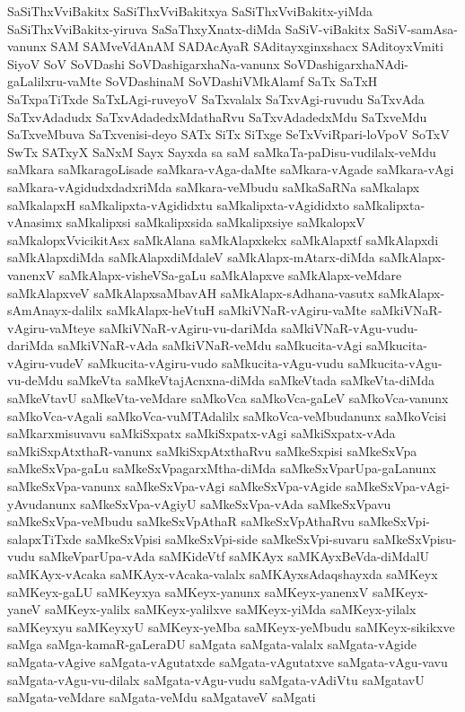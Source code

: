 {SaSiThxVviBakitx
SaSiThxVviBakitxya
SaSiThxVviBakitx-yiMda
SaSiThxVviBakitx-yiruva
SaSaThxyXnatx-diMda
SaSiV-viBakitx
SaSiV-samAsa-vanunx
SAM
SAMveVdAnAM
SADAcAyaR
SAditayxginxshacx
SAditoyxVmiti
SiyoV
SoV
SoVDashi
SoVDashigarxhaNa-vanunx
SoVDashigarxhaNAdi-gaLalilxru-vaMte
SoVDashinaM
SoVDashiVMkAlamf
SaTx
SaTxH
SaTxpaTiTxde
SaTxLAgi-ruveyoV
SaTxvalalx
SaTxvAgi-ruvudu
SaTxvAda
SaTxvAdadudx
SaTxvAdadedxMdathaRvu
SaTxvAdadedxMdu
SaTxveMdu
SaTxveMbuva
SaTxvenisi-deyo
SATx
SiTx
SiTxge
SeTxVviRpari-loVpoV
SoTxV
SwTx
SATxyX
SaNxM
Sayx
Sayxda
sa
saM
saMkaTa-paDisu-vudilalx-veMdu
saMkara
saMkaragoLisade
saMkara-vAga-daMte
saMkara-vAgade
saMkara-vAgi
saMkara-vAgidudxdadxriMda
saMkara-veMbudu
saMkaSaRNa
saMkalapx
saMkalapxH
saMkalipxta-vAgididxtu
saMkalipxta-vAgididxto
saMkalipxta-vAnasimx
saMkalipxsi
saMkalipxsida
saMkalipxsiye
saMkalopxV
saMkalopxVvicikitAsx
saMkAlana
saMkAlapxkekx
saMkAlapxtf
saMkAlapxdi
saMkAlapxdiMda
saMkAlapxdiMdaleV
saMkAlapx-mAtarx-diMda
saMkAlapx-vanenxV
saMkAlapx-visheVSa-gaLu
saMkAlapxve
saMkAlapx-veMdare
saMkAlapxveV
saMkAlapxsaMbavAH
saMkAlapx-sAdhana-vasutx
saMkAlapx-sAmAnayx-dalilx
saMkAlapx-heVtuH
saMkiVNaR-vAgiru-vaMte
saMkiVNaR-vAgiru-vaMteye
saMkiVNaR-vAgiru-vu-dariMda
saMkiVNaR-vAgu-vudu-dariMda
saMkiVNaR-vAda
saMkiVNaR-veMdu
saMkucita-vAgi
saMkucita-vAgiru-vudeV
saMkucita-vAgiru-vudo
saMkucita-vAgu-vudu
saMkucita-vAgu-vu-deMdu
saMkeVta
saMkeVtajAcnxna-diMda
saMkeVtada
saMkeVta-diMda
saMkeVtavU
saMkeVta-veMdare
saMkoVca
saMkoVca-gaLeV
saMkoVca-vanunx
saMkoVca-vAgali
saMkoVca-vuMTAdalilx
saMkoVca-veMbudanunx
saMkoVcisi
saMkarxmisuvavu
saMkiSxpatx
saMkiSxpatx-vAgi
saMkiSxpatx-vAda
saMkiSxpAtxthaR-vanunx
saMkiSxpAtxthaRvu
saMkeSxpisi
saMkeSxVpa
saMkeSxVpa-gaLu
saMkeSxVpagarxMtha-diMda
saMkeSxVparUpa-gaLanunx
saMkeSxVpa-vanunx
saMkeSxVpa-vAgi
saMkeSxVpa-vAgide
saMkeSxVpa-vAgi-yAvudanunx
saMkeSxVpa-vAgiyU
saMkeSxVpa-vAda
saMkeSxVpavu
saMkeSxVpa-veMbudu
saMkeSxVpAthaR
saMkeSxVpAthaRvu
saMkeSxVpi-salapxTiTxde
saMkeSxVpisi
saMkeSxVpi-side
saMkeSxVpi-suvaru
saMkeSxVpisu-vudu
saMkeVparUpa-vAda
saMKideVtf
saMKAyx
saMKAyxBeVda-diMdalU
saMKAyx-vAcaka
saMKAyx-vAcaka-valalx
saMKAyxsAdaqshayxda
saMKeyx
saMKeyx-gaLU
saMKeyxya
saMKeyx-yanunx
saMKeyx-yanenxV
saMKeyx-yaneV
saMKeyx-yalilx
saMKeyx-yalilxve
saMKeyx-yiMda
saMKeyx-yilalx
saMKeyxyu
saMKeyxyU
saMKeyx-yeMba
saMKeyx-yeMbudu
saMKeyx-sikikxve
saMga
saMga-kamaR-gaLeraDU
saMgata
saMgata-valalx
saMgata-vAgide
saMgata-vAgive
saMgata-vAgutatxde
saMgata-vAgutatxve
saMgata-vAgu-vavu
saMgata-vAgu-vu-dilalx
saMgata-vAgu-vudu
saMgata-vAdiVtu
saMgatavU
saMgata-veMdare
saMgata-veMdu
saMgataveV
saMgati
}
